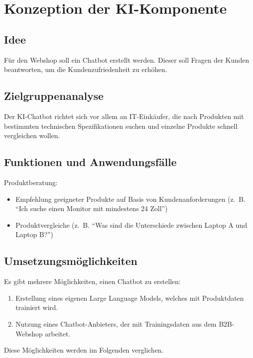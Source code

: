 \documentclass[%
	12pt,
	a4paper,
	oneside,
	parskip=full
]{scrbook}
\begin{document}
\chapter{Konzeption der KI-Komponente}
\section{Idee}
Für den Webshop soll ein Chatbot erstellt werden. 
Dieser soll Fragen der Kunden beantworten, um die Kundenzufriedenheit zu erhöhen.
\section{Zielgruppenanalyse}
Der KI-Chatbot richtet sich vor allem an IT-Einkäufer, die nach Produkten mit bestimmten technischen Spezifikationen suchen und einzelne Produkte schnell vergleichen wollen.
\section{Funktionen und Anwendungsfälle}
Produktberatung:
\begin{itemize}
	\item Empfehlung geeigneter Produkte auf Basis von Kundenanforderungen (z.~B. \enquote{Ich suche einen Monitor mit mindestens 24 Zoll})
	\item Produktvergleiche (z.~B. \enquote{Was sind die Unterschiede zwischen Laptop A und Laptop B?})
\end{itemize}
\section{Umsetzungsmöglichkeiten}
Es gibt mehrere Möglichkeiten, einen Chatbot zu erstellen:
\begin{enumerate}
	\item Erstellung eines eigenen Large Language Models, welches mit Produktdaten trainiert wird.
	\item Nutzung eines Chatbot-Anbieters, der mit Trainingsdaten aus dem B2B-Webshop arbeitet.
\end{enumerate}
Diese Möglichkeiten werden im Folgenden verglichen.
\end{document}

